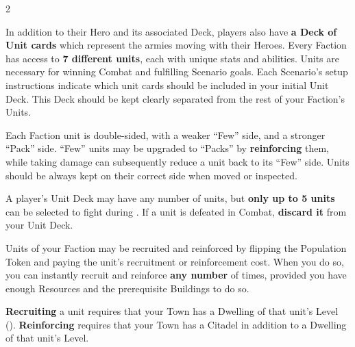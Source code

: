 
\begin{multicols*}{2}

In addition to their Hero and its associated Deck, players also have \textbf{a Deck of Unit cards} which represent the armies moving with their Heroes.
Every Faction has access to \textbf{7 different units}, each with unique stats and abilities.
Units are necessary for winning Combat and fulfilling Scenario goals.
Each Scenario's setup instructions indicate which unit cards should be included in your initial Unit Deck.
This Deck should be kept clearly separated from the rest of your Faction's Units.\par
Each Faction unit is double-sided, with a weaker ``Few'' side, and a stronger ``Pack'' side.
``Few'' units may be upgraded to ``Packs'' by \textbf{reinforcing} them, while taking damage can subsequently reduce a unit back to its ``Few'' side.
Units should be always kept on their correct side when moved or inspected.\par
A player's Unit Deck may have any number of units, but \textbf{only up to 5 units} can be selected to fight during .
If a unit is defeated in Combat, \textbf{discard it} from your Unit Deck.\par
Units of your Faction may be recruited and reinforced by flipping the Population Token and paying the unit's recruitment  or reinforcement  cost.
When you do so, you can instantly recruit and reinforce \textbf{any number} of times, provided you have enough Resources and the prerequisite Buildings to do so.\par
\textbf{Recruiting} a unit requires that your Town has a Dwelling of that unit's Level ().
\textbf{Reinforcing} requires that your Town has a Citadel in addition to a Dwelling of that unit's Level.\par



\end{multicols*}
